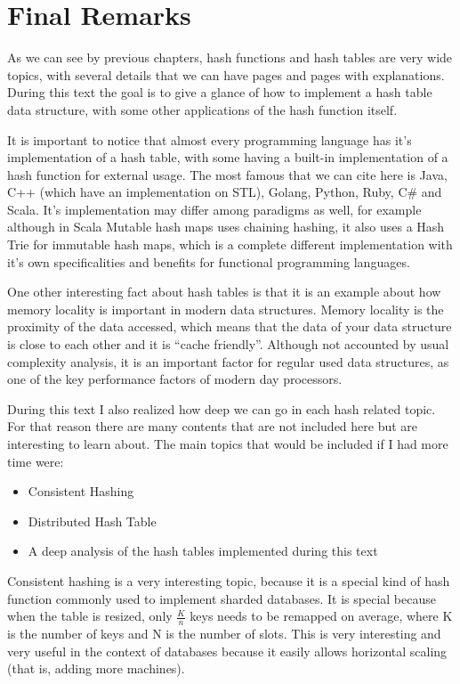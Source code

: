 \chapter{Final Remarks}
\label{cap:conclusions}

As we can see by previous chapters, hash functions and hash tables are very wide topics, with several details that we can have pages and pages with explanations. During this text the goal is to give a glance of how to implement a hash table data structure, with some other applications of the hash function itself.

It is important to notice that almost every programming language has it's implementation of a hash table, with some having a built-in implementation of a hash function for external usage. The most famous that we can cite here is Java, C++ (which have an implementation on STL), Golang, Python, Ruby, C\# and Scala. It's implementation may differ among paradigms as well, for example although in Scala Mutable hash maps uses chaining hashing, it also uses a Hash Trie for immutable hash maps, which is a complete different implementation with it's own specificalities and benefits for functional programming languages. \citep{hashMapAnalysis} 

One other interesting fact about hash tables is that it is an example about how memory locality is important in modern data structures. Memory locality is the proximity of the data accessed, which means that the data of your data structure is close to each other and it is ``cache friendly''. Although not accounted by usual complexity analysis, it is an important factor for regular used data structures, as one of the key performance factors of modern day processors.

During this text I also realized how deep we can go in each hash related topic. For that reason there are many contents that are not included here but are interesting to learn about. The main topics that would be included if I had more time were:

\begin{itemize}
\item Consistent Hashing
\item Distributed Hash Table
\item A deep analysis of the hash tables implemented during this text
\end{itemize}

Consistent hashing is a very interesting topic, because it is a special kind of hash function commonly used to implement sharded databases. It is special because when the table is resized, only \( \frac{K}{n} \) keys needs to be remapped on average, where K is the number of keys and N is the number of slots.\citep{wikiConsistent} This is very interesting and very useful in the context of databases because it easily allows horizontal scaling (that is, adding more machines).

